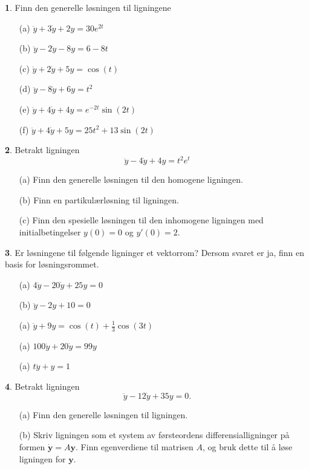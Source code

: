 \documentclass{article}
\theoremstyle{definition}
\newtheorem{oppg}{}
\theoremstyle{remark}
\begin{document}
\begin{multicols*}{2}
\begin{oppg}  
  Finn den generelle løsningen til ligningene
  \begin{itemize}
    \item[(a)] $\ddot{y} + 3\dot{y} + 2y = 30e^{2t}$
    \item[(b)] $\ddot{y} - 2\dot{y} - 8y = 6 - 8t$
    \item[(c)] $\ddot{y} + 2\dot{y} + 5y = \cos(t)$
    \item[(d)] $\ddot{y} - 8\dot{y} + 6y = t^2$
    \item[(e)] $\ddot{y} + 4\dot{y} + 4y = e^{-2t} \sin(2t)$
    \item[(f)] $\ddot{y} + 4\dot{y} + 5y = 25t^2 + 13\sin(2t)$ 
  \end{itemize}
\end{oppg}

\begin{oppg}  
  Betrakt ligningen
  \begin{equation*}
    \ddot{y} - 4\dot{y} + 4y = t^2 e^t
  \end{equation*}
  \begin{itemize}
    \item[(a)] Finn den generelle løsningen til den homogene ligningen.
    \item[(b)] Finn en partikulærløsning til ligningen.
    \item[(c)] Finn den spesielle løsningen til den inhomogene ligningen med initialbetingelser $y(0) = 0$ og $y'(0) = 2$.
  \end{itemize}
\end{oppg}

\begin{oppg}
  Er løsningene til følgende ligninger et vektorrom? Dersom svaret er ja, finn en basis for løsningsrommet.
  \begin{itemize}
    \item[(a)] $4\ddot{y} - 20\dot{y} + 25y = 0$
    \item[(b)] $\ddot{y} - 2y + 10 = 0$
    \item[(a)] $\ddot{y} + 9y = \cos(t) + \frac{1}{3} \cos(3t)$
    \item[(a)] $100\ddot{y} + 20\dot{y} = 99y$
    \item[(a)] $t \ddot{y} + y = 1$ 
  \end{itemize}
\end{oppg}

\begin{oppg}  
  Betrakt ligningen
  \begin{equation*}
    \ddot{y} - 12\dot{y} + 35y = 0.
  \end{equation*}
  \begin{itemize}
    \item[(a)] Finn den generelle løsningen til ligningen.
    \item[(b)] Skriv ligningen som et system av førsteordens differensialligninger på formen $\dot{\boldsymbol{y}}= A\boldsymbol{y}$. Finn egenverdiene til matrisen $A$, og bruk dette til å løse ligningen for $\boldsymbol{y}$.
  \end{itemize}
\end{oppg}


\end{multicols*}
\end{document}
